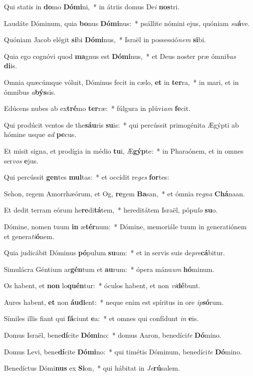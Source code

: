 \item Qui statis in \textbf{do}mo \textbf{Dó}\textbf{mi}ni,~* in átriis domus De\textit{i} \textbf{nos}tri.
\item Laudáte Dóminum, quia \textbf{bo}nus \textbf{Dó}\textbf{mi}nus:~* psállite nómini ejus, quóniam \textit{su}\textbf{á}ve.
\item Quóniam Jacob elégit \textbf{si}bi \textbf{Dó}\textbf{mi}nus,~* Israël in possessió\textit{nem} \textbf{si}bi.
\item Quia ego cognóvi quod \textbf{ma}gnus est \textbf{Dó}\textbf{mi}nus,~* et Deus noster præ ómni\textit{bus} \textbf{di}is.
\item Omnia quæcúmque vóluit, Dóminus fecit in cælo, \textbf{et} in \textbf{ter}ra,~* in mari, et in ómnibus \textit{a}\textbf{býs}sis.
\item Edúcens nubes ab ex\textbf{tré}mo \textbf{ter}ræ:~* fúlgura in plúvi\textit{am} \textbf{fe}cit.
\item Qui prodúcit ventos de the\textbf{sáu}ris \textbf{su}is:~* qui percússit primogénita Ægýpti ab hómine usque \textit{ad} \textbf{pe}cus.
\item Et misit signa, et prodígia in médio \textbf{tu}i, Æ\textbf{gýp}te:~* in Pharaónem, et in omnes ser\textit{vos} \textbf{e}jus.
\item Qui percússit \textbf{gen}tes \textbf{mul}tas:~* et occídit re\textit{ges} \textbf{for}tes:
\item Sehon, regem Amorrhæórum, et Og, \textbf{re}gem \textbf{Ba}san,~* et ómnia re\textit{gna} \textbf{Chá}naan.
\item Et dedit terram eórum he\textbf{re}di\textbf{tá}tem,~* hereditátem Israël, pópu\textit{lo} \textbf{su}o.
\item Dómine, nomen tuum \textbf{in} æ\textbf{tér}num:~* Dómine, memoriále tuum in generatiónem et genera\textit{ti}\textbf{ó}nem.
\item Quia judicábit Dóminus \textbf{pó}pulum \textbf{su}um:~* et in servis suis de\textit{pre}\textbf{cá}bitur.
\item Simulácra Géntium ar\textbf{gén}tum et \textbf{au}rum:~* ópera mánu\textit{um} \textbf{hó}minum.
\item Os habent, et \textbf{non} lo\textbf{quén}tur:~* óculos habent, et non \textit{vi}\textbf{dé}bunt.
\item Aures habent, \textbf{et} non \textbf{áu}\textbf{di}ent:~* neque enim est spíritus in ore \textit{ip}\textbf{só}rum.
\item Símiles illis fiant qui \textbf{fá}ciunt \textbf{e}a:~* et omnes qui confídunt \textit{in} \textbf{e}is.
\item Domus Israël, bene\textbf{dí}cite \textbf{Dó}\textbf{mi}no:~* domus Aaron, benedíci\textit{te} \textbf{Dó}mino.
\item Domus Levi, bene\textbf{dí}cite \textbf{Dó}\textbf{mi}no:~* qui timétis Dóminum, benedíci\textit{te} \textbf{Dó}mino.
\item Benedíctus Dómi\textbf{nus} ex \textbf{Si}on,~* qui hábitat in \textit{Je}\textbf{rú}salem.
